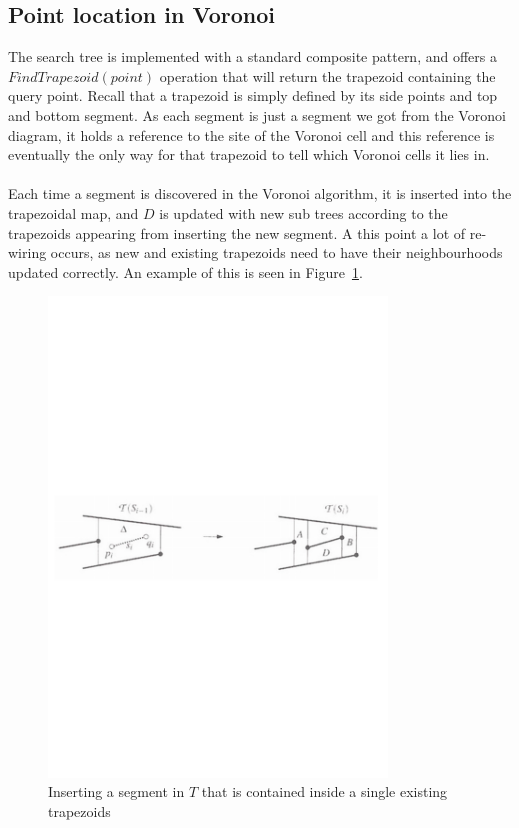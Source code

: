 \subsection{Point location in Voronoi}
The search tree is implemented with a standard composite pattern, and offers a $FindTrapezoid(point)$ operation that will return the trapezoid containing the query point.  Recall that a trapezoid is simply defined by its side points and top and bottom segment. As each segment is just a segment we got from the Voronoi diagram, it holds a reference to the site of the Voronoi cell and this reference is eventually the only way for that trapezoid to tell which Voronoi cells it lies in. 

\paragraph{}
Each time a segment is discovered in the Voronoi algorithm, it is inserted into the trapezoidal map, and $D$ is updated with new sub trees according to the trapezoids appearing from inserting the new segment. A this point a lot of re-wiring occurs, as new and existing trapezoids need to have their neighbourhoods updated correctly. An example of this is seen in Figure~\ref{fig:contained_segment}. 

\begin{figure}[]
    \centering
      \includegraphics[width=90mm]{images/contained_segment.pdf}
    \caption{Inserting a segment in $T$ that is contained inside a single existing trapezoids}
    \label{fig:contained_segment}
\end{figure}


